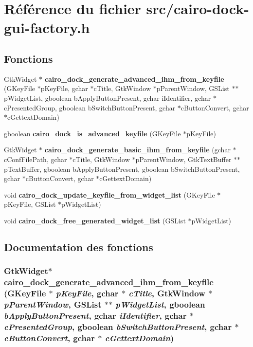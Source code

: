 \section{Référence du fichier src/cairo-dock-gui-factory.h}
\label{cairo-dock-gui-factory_8h}
\subsection*{Fonctions}
\begin{CompactItemize}
\item 
GtkWidget $\ast$ {\bf cairo\_\-dock\_\-generate\_\-advanced\_\-ihm\_\-from\_\-keyfile} (GKeyFile $\ast$pKeyFile, gchar $\ast$cTitle, GtkWindow $\ast$pParentWindow, GSList $\ast$$\ast$pWidgetList, gboolean bApplyButtonPresent, gchar iIdentifier, gchar $\ast$cPresentedGroup, gboolean bSwitchButtonPresent, gchar $\ast$cButtonConvert, gchar $\ast$cGettextDomain)
\item 
gboolean {\bf cairo\_\-dock\_\-is\_\-advanced\_\-keyfile} (GKeyFile $\ast$pKeyFile)
\item 
GtkWidget $\ast$ {\bf cairo\_\-dock\_\-generate\_\-basic\_\-ihm\_\-from\_\-keyfile} (gchar $\ast$cConfFilePath, gchar $\ast$cTitle, GtkWindow $\ast$pParentWindow, GtkTextBuffer $\ast$$\ast$pTextBuffer, gboolean bApplyButtonPresent, gboolean bSwitchButtonPresent, gchar $\ast$cButtonConvert, gchar $\ast$cGettextDomain)
\item 
void {\bf cairo\_\-dock\_\-update\_\-keyfile\_\-from\_\-widget\_\-list} (GKeyFile $\ast$pKeyFile, GSList $\ast$pWidgetList)
\item 
void {\bf cairo\_\-dock\_\-free\_\-generated\_\-widget\_\-list} (GSList $\ast$pWidgetList)
\end{CompactItemize}


\subsection{Documentation des fonctions}
\subsubsection{\setlength{\rightskip}{0pt plus 5cm}GtkWidget$\ast$ cairo\_\-dock\_\-generate\_\-advanced\_\-ihm\_\-from\_\-keyfile (GKeyFile $\ast$ {\em pKeyFile}, gchar $\ast$ {\em cTitle}, GtkWindow $\ast$ {\em pParentWindow}, GSList $\ast$$\ast$ {\em pWidgetList}, gboolean {\em bApplyButtonPresent}, gchar {\em iIdentifier}, gchar $\ast$ {\em cPresentedGroup}, gboolean {\em bSwitchButtonPresent}, gchar $\ast$ {\em cButtonConvert}, gchar $\ast$ {\em cGettextDomain})}\label{cairo-dock-gui-factory_8h_4d3c19063f07346f2170af6beea03fdf}


